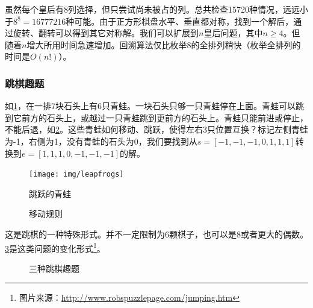 \documentclass[b5paper]{ctexart}
\begin{document}
虽然每个皇后有8列选择，但只尝试尚未被占的列。总共检查15720种情况，远远小于$8^8 = 16777216$种可能\cite{wiki-8-queens}。由于正方形棋盘水平、垂直都对称，找到一个解后，通过旋转、翻转可以得到其它对称解。我们可以扩展到$n$皇后问题，其中$n \geq 4$。但随着$n$增大所用时间急速增加。回溯算法仅比枚举8的全排列稍快（枚举全排列的时间是$O(n!)$）。

\begin{Exercise}
\end{Exercise}

\subsubsection{跳棋趣题}

如\cref{fig:leapfrog}，在一排7块石头上有6只青蛙。一块石头只够一只青蛙停在上面。青蛙可以跳到它前方的石头上，或越过一只青蛙跳到更前方的石头上。青蛙只能前进或停止，不能后退，如\cref{fig:pegrules}。这些青蛙如何移动、跳跃，使得左右3只位置互换？标记左侧青蛙为-1，右侧为1，没有青蛙的石头为0，我们要找到从$s = [-1, -1, -1, 0, 1, 1, 1]$转换到$e = [1, 1, 1, 0, -1, -1, -1]$的解。

\begin{figure}[htbp]
 \centering
 \texttt{[image: img/leapfrogs]}
 \caption{跳跃的青蛙}
 \label{fig:leapfrog}
\end{figure}

\begin{figure}[htbp]
 \centering
  \hspace{0.02\textwidth}
  \hspace{0.02\textwidth}
 \caption{移动规则}
 \label{fig:pegrules}
\end{figure}

这是跳棋的一种特殊形式。并不一定限制为6颗棋子，也可以是8或者更大的偶数。\cref{fig:pegpuzzles}是这类问题的变化形式\footnote{图片来源：\url{http://www.robspuzzlepage.com/jumping.htm}}。

\begin{figure}[htbp]
 \centering
  \hspace{0.02\textwidth}
  \hspace{0.02\textwidth}
 \caption{三种跳棋趣题}
 \label{fig:pegpuzzles}
\end{figure}
\end{document}
